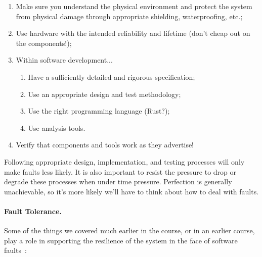 \begin{enumerate}
	\item Make sure you understand the physical environment and protect the system from physical damage through appropriate shielding, waterproofing, etc.;
	\item Use hardware with the intended reliability and lifetime (don't cheap out on the components!);
	\item Within software development...
		\begin{enumerate}
			\item Have a sufficiently detailed and rigorous specification;
			\item Use an appropriate design and test methodology;
			\item Use the right programming language (Rust?);
			\item Use analysis tools.
		\end{enumerate}
	\item Verify that components and tools work as they advertise!
\end{enumerate}

Following appropriate design, implementation, and testing processes will only make faults less likely. It is also important to resist the pressure to drop or degrade these processes when under time pressure. Perfection is generally unachievable, so it's more likely we'll have to think about how to deal with faults.

\paragraph{Fault Tolerance.}
Some of the things we covered much earlier in the course, or in an earlier course, play a role in supporting the resilience of the system in the face of software faults~\cite{osi}:

